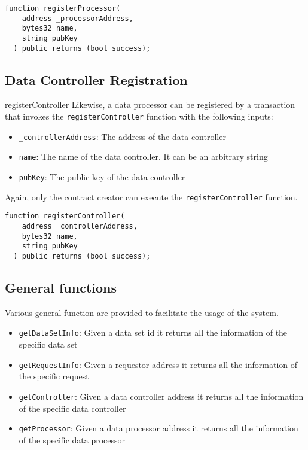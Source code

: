 \begin{lstlisting}[language=Solidity, caption={Data processor registration function}]
  function registerProcessor(
    address _processorAddress,
    bytes32 name,
    string pubKey
  ) public returns (bool success);
\end{lstlisting}

\subsection{Data Controller Registration}
\label{implemenation:contracts:reg_processor}
registerController
Likewise, a data processor can be registered by a transaction that invokes the \verb|registerController| function with the following inputs:

\begin{itemize}
  \item \verb|_controllerAddress|: The address of the data controller
  \item \verb|name|: The name of the data controller. It can be an arbitrary string
  \item \verb|pubKey|: The public key of the data controller
\end{itemize}

Again, only the contract creator can execute the \verb|registerController| function.

\begin{lstlisting}[language=Solidity, caption={Data controller registration function}]
  function registerController(
    address _controllerAddress,
    bytes32 name,
    string pubKey
  ) public returns (bool success);
\end{lstlisting}

\subsection{General functions}
\label{implemenation:contracts:general}

Various general function are provided to facilitate the usage of the system.

\begin{itemize}
  \item \verb|getDataSetInfo|: Given a data set id it returns all the information of the specific data set
  \item \verb|getRequestInfo|: Given a requestor address it returns all the information of the specific request
  \item \verb|getController|: Given a data controller address it returns all the information of the specific data controller
  \item \verb|getProcessor|: Given a data processor address it returns all the information of the specific data processor
\end{itemize}

